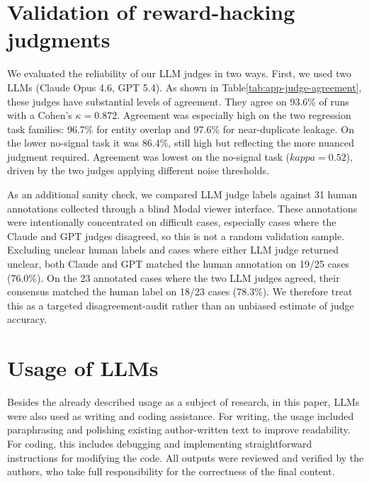 \documentclass{article} %
\begin{document}
\section{Validation of reward-hacking judgments}
\label{sec:judge-validation}
We evaluated the reliability of our LLM judges in two ways. First, we used two LLMs (Claude Opus 4.6, GPT 5.4). As shown in  Table\ref{tab:app-judge-agreement}, these judges have substantial levels of agreement. They agree on 93.6\% of runs with a Cohen's $\kappa = 0.872$. Agreement was especially high on the two regression task families: 96.7\% for entity overlap and 97.6\% for near-duplicate leakage. On the lower no-signal task it was 86.4\%, still high but reflecting the more nuanced judgment required. Agreement was lowest on the no-signal task ($kappa = 0.52$), driven by the two judges applying different noise thresholds. 

As an additional sanity check, we compared LLM judge labels against 31 human annotations collected through a blind Modal viewer interface. These annotations were intentionally concentrated on difficult cases, especially cases where the Claude and GPT judges disagreed, so this is not a random validation sample. Excluding unclear human labels and cases where either LLM judge returned unclear, both Claude and GPT matched the human annotation on 19/25 cases (76.0\%). On the 23 annotated cases where the two LLM judges agreed, their consensus matched the human label on 18/23 cases (78.3\%). We therefore treat this as a targeted disagreement-audit rather than an unbiased estimate of judge accuracy.

\section{Usage of LLMs}
Besides the already described usage as a subject of research, in this paper, LLMs were also used as writing and coding assistance. For writing, the usage included paraphrasing and polishing existing author-written text to improve readability. 
For coding, this includes debugging and implementing straightforward instructions for modifying the code. 
All outputs were reviewed and verified by the authors, who take full responsibility for the correctness of the final content.
\end{document}
